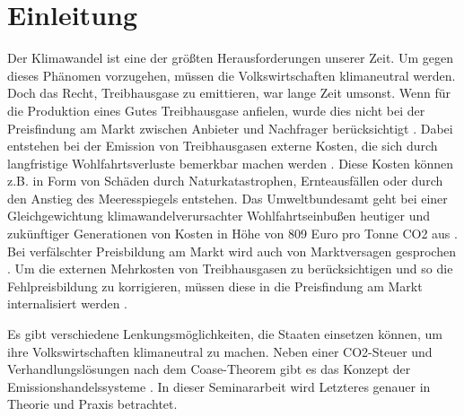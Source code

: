 \chapter{Einleitung}

Der Klimawandel ist eine der größten Herausforderungen unserer Zeit. Um gegen dieses Phänomen vorzugehen, müssen die Volkswirtschaften klimaneutral werden.
Doch das Recht, Treibhausgase zu emittieren, war lange Zeit umsonst.
Wenn für die Produktion eines Gutes Treibhausgase anfielen, wurde dies nicht bei der Preisfindung am Markt zwischen Anbieter und Nachfrager berücksichtigt \cite[S. 161]{hubert.2020}.
Dabei entstehen bei der Emission von Treibhausgasen externe Kosten, die sich durch langfristige Wohlfahrtsverluste bemerkbar machen werden \cite[S. 25]{rabe.2018} \cite{ub4.2023}.
Diese Kosten können z.B. in Form von Schäden durch Naturkatastrophen, Ernteausfällen oder durch den Anstieg des Meeresspiegels entstehen.
Das Umweltbundesamt geht bei einer Gleichgewichtung klimawandelverursachter Wohlfahrtseinbußen heutiger und zukünftiger Generationen von Kosten in Höhe von 809 Euro pro Tonne CO2 aus \cite{ub4.2023}.
Bei verfälschter Preisbildung am Markt wird auch von Marktversagen gesprochen \cite[S. 268]{hubert.2019}.
Um die externen Mehrkosten von Treibhausgasen zu berücksichtigen und so die Fehlpreisbildung zu korrigieren, müssen diese in die Preisfindung am Markt internalisiert werden \cite[S. 161]{hubert.2020}.

Es gibt verschiedene Lenkungsmöglichkeiten, die Staaten einsetzen können, um ihre Volkswirtschaften klimaneutral zu machen.
Neben einer CO2-Steuer und Verhandlungslösungen nach dem Coase-Theorem gibt es das Konzept der Emissionshandelssysteme \cite[S. 161]{hubert.2020}.
In dieser Seminararbeit wird Letzteres genauer in Theorie und Praxis betrachtet.